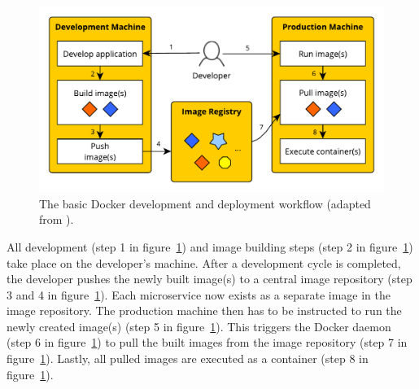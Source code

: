 \begin{figure}[H]
\begin{center}
  \includegraphics[scale=0.7]{images/figures/docker_workflow.pdf}
\end{center}
\caption[The basic Docker development and deployment workflow.]{The basic Docker development and deployment workflow (adapted from \autocite[Fig. 1.6]{LuksaKubernetesAction2017}).}
\label{fig:docker_workflow}
\end{figure}

All development (step 1 in figure~\ref{fig:docker_workflow}) and image building steps
(step 2 in figure~\ref{fig:docker_workflow}) take place on the developer's machine.
After a development cycle is completed, the developer pushes the newly built
image(s) to a central image repository (step 3 and 4
in figure~\ref{fig:docker_workflow}). Each microservice now exists as a separate image
in the image repository. The production machine then has to be instructed to
run the newly created image(s) (step 5 in figure~\ref{fig:docker_workflow}). This
triggers the Docker daemon (step 6 in figure~\ref{fig:docker_workflow}) to pull the
built images from the image repository (step 7 in figure~\ref{fig:docker_workflow}).
Lastly, all pulled images are executed as a container (step 8
in figure~\ref{fig:docker_workflow}).

